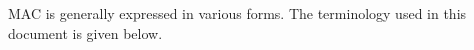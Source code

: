 MAC is generally expressed in various forms. The terminology used in this document is given below.\relax